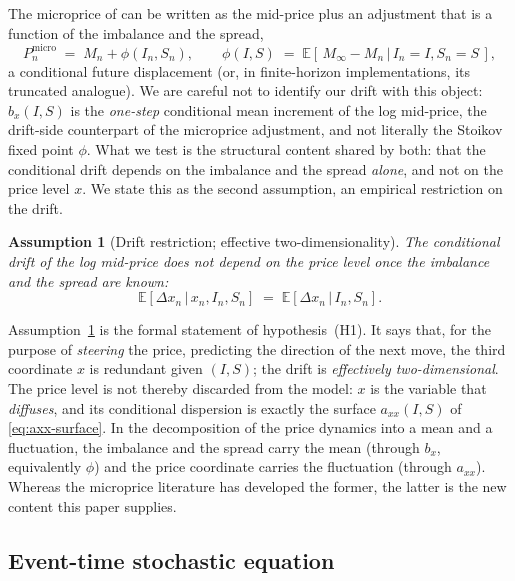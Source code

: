 \documentclass[11pt]{article}
\theoremstyle{plain}
\newtheorem{assumption}{Assumption}
\theoremstyle{definition}
\newcommand{\E}{\mathbb{E}}
\newcommand{\given}{\,\vert\,}
\newcommand{\axx}{a_{xx}}
\begin{document}
The microprice of \citet{stoikov2018} can be written as the mid-price plus an
adjustment that is a function of the imbalance and the spread,
\begin{equation}
  P^{\mathrm{micro}}_n \;=\; M_n + \phi(I_n, S_n),
  \qquad
  \phi(I,S) \;=\; \E\!\left[\,M_\infty-M_n \given I_n=I, S_n=S\,\right],
  \label{eq:microprice}
\end{equation}
a conditional future displacement (or, in finite-horizon implementations, its
truncated analogue). We are careful not to identify our drift with this object: $b_x(I,S)$
is the \emph{one-step} conditional mean increment of the log mid-price, the drift-side
counterpart of the microprice adjustment, and not literally the Stoikov fixed point
$\phi$. What we test is the structural content shared by both: that the conditional
drift depends on the imbalance and the spread \emph{alone}, and not on the price level
$x$. We state this as the second assumption, an empirical restriction on the drift.

\begin{assumption}[Drift restriction; effective two-dimensionality]
\label{ass:drift}
The conditional drift of the log mid-price does not depend on the price level once
the imbalance and the spread are known:
\begin{equation}
  \E\!\left[\Delta x_n \given x_n, I_n, S_n\right]
  \;=\;
  \E\!\left[\Delta x_n \given I_n, S_n\right].
  \label{eq:drift-restriction}
\end{equation}
\end{assumption}

\noindent
Assumption~\ref{ass:drift} is the formal statement of hypothesis~(H1). It says that,
for the purpose of \emph{steering} the price, predicting the direction of the next
move, the third coordinate $x$ is redundant given $(I,S)$; the drift is
\emph{effectively two-dimensional}. The price level is not thereby discarded from the
model: $x$ is the variable that \emph{diffuses}, and its conditional dispersion is
exactly the surface $\axx(I,S)$ of \eqref{eq:axx-surface}. In the decomposition of
the price dynamics into a mean and a fluctuation, the imbalance and the spread carry
the mean (through $b_x$, equivalently $\phi$) and the price coordinate carries the
fluctuation (through $\axx$). Whereas the microprice literature has developed the
former, the latter is the new content this paper supplies.

\subsection{Event-time stochastic equation}
\label{sub:sde}
\end{document}
